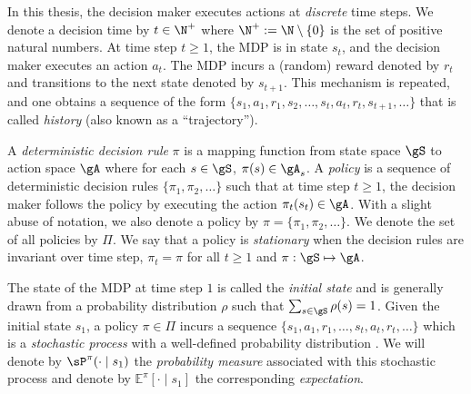In this thesis, the decision maker executes actions at \emph{discrete} time steps.
We denote a decision time by $t\in\N^+$ where $\N^+:=\N\setminus\{0\}$ is the set of positive natural numbers.
At time step $t\ge1$, the MDP is in state $s_t$, and the decision maker executes an action $a_t$.
The MDP incurs a (random) reward denoted by $r_t$ and transitions to the next state denoted by $s_{t+1}$.
This mechanism is repeated, and one obtains a sequence of the form $\{s_1,a_1,r_1,s_2,\dots,s_t,a_t,r_t,s_{t+1},\dots\}$ that is called \emph{history} (also known as a ``trajectory'').

A \emph{deterministic decision rule} $\pi$ is a mapping function from state space $\gS$ to action space $\gA$ where for each $s\in\gS$, $\pi(s)\in\gA_s$.
A \emph{policy} is a sequence of deterministic decision rules $\{\pi_1,\pi_2,\dots\}$ such that at time step $t\ge1$, the decision maker follows the policy by executing the action $\pi_t(s_t)\in\gA$.
With a slight abuse of notation, we also denote a policy by $\pi=\{\pi_1,\pi_2,\dots\}$.
We denote the set of all policies by $\Pi$.
We say that a policy is \emph{stationary} when the decision rules are invariant over time step, $\pi_t=\pi$ for all $t\ge1$ and $\pi:\gS\mapsto\gA$.

The state of the MDP at time step $1$ is called the \emph{initial state} and is generally drawn from a probability distribution $\rho$ such that $\sum_{s\in\gS}\rho(s)=1$.
Given the initial state $s_1$, a policy $\pi\in\Pi$ incurs a sequence $\{s_1,a_1,r_1,\dots,s_t,a_t,r_t,\dots\}$ which is a \emph{stochastic process} with a well-defined probability distribution \cite[Section~2.1.6]{puterman2014markov}.
We will denote by $\sP^\pi(\cdot\mid s_1)$ the \emph{probability measure} associated with this stochastic process and denote by $\mathbb{E}^\pi[\cdot \mid s_1]$ the corresponding \emph{expectation}.

